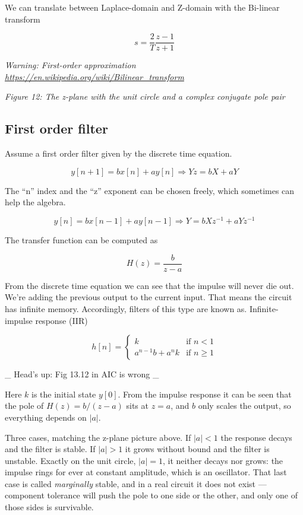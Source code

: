 We can translate between Laplace-domain and Z-domain with the Bi-linear
transform

\[ s = \frac{2}{T}\frac{z -1}{z + 1}\]

\emph{Warning: First-order approximation
\url{https://en.wikipedia.org/wiki/Bilinear_transform}}


{
\centering
{}
}

\emph{Figure 12: The z-plane with the unit circle and a complex
conjugate pole pair}

\subsection{First order filter}\label{first-order-filter}

Assume a first order filter given by the discrete time equation.

\[ y[n+1] = bx[n] + ay[n] \Rightarrow Y z = b X + a Y\]

The ``n'' index and the ``z'' exponent can be chosen freely, which
sometimes can help the algebra.

\[ y[n] = b x[n-1] + ay[n-1] \Rightarrow Y = b X z^{-1} + a Y z^{-1}  \]

The transfer function can be computed as

\[ H(z) = \frac{b}{z-a}\]

From the discrete time equation we can see that the impulse will never
die out. We're adding the previous output to the current input. That
means the circuit has infinite memory. Accordingly, filters of this type
are known as. Infinite-impulse response (IIR)

\[ h[n] = \begin{cases} k & \text{if } n < 1 \\ a^{n-1}b + a^n k & \text{if } n \geq 1 \end{cases}\]

\_ Head's up: Fig 13.12 in AIC is wrong \_

Here \(k\) is the initial state \(y[0]\). From the impulse response it
can be seen that the pole of \(H(z) = b/(z-a)\) sits at \(z = a\), and
\(b\) only scales the output, so everything depends on \(\vert a\vert\).

Three cases, matching the z-plane picture above. If \(\vert a\vert < 1\)
the response decays and the filter is stable. If \(\vert a\vert > 1\) it
grows without bound and the filter is unstable. Exactly on the unit
circle, \(\vert a\vert = 1\), it neither decays nor grows: the impulse
rings for ever at constant amplitude, which is an oscillator. That last
case is called \emph{marginally} stable, and in a real circuit it does
not exist --- component tolerance will push the pole to one side or the
other, and only one of those sides is survivable.


